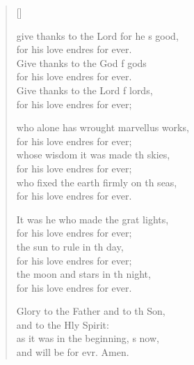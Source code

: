\settowidth{\versewidth}{O give thanks to the Lord for he is good, *}
\begin{verse}[\versewidth]
  \begin{patverse}
 give thanks to the Lord for he \pointup{\i}s good,\Med\\
    for his love endres for ever.\\
Give thanks to the God f gods\Med\\
    for his love endres for ever.\\
Give thanks to the Lord f lords,\Med\\
    for his love endres for ever;

who alone has wrought marvellus works,\Med\\
    for his love endres for ever;\\
whose wisdom it was made th skies,\Med\\
    for his love endres for ever;\\
who fixed the earth firmly on th seas,\Med\\
    for his love endres for ever.

It was he who made the grat lights,\Med\\
    for his love endres for ever;\\
the sun to rule in th day,\Med\\
    for his love endres for ever;\\
the moon and stars in th night,\Med\\
    for his love endres for ever.

Glory to the Father and to th Son,\Med\\
    and to the Hly Spirit:\\
as it was in the beginning, \pointup{\i}s now,\Med\\
    and will be for evr. Amen.
  \end{patverse}
\end{verse}
